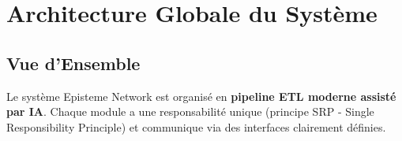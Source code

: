 \documentclass[12pt,a4paper]{report}
\begin{document}
\chapter{Architecture Globale du Système}

\section{Vue d'Ensemble}

Le système Episteme Network est organisé en \textbf{pipeline ETL moderne assisté par IA}. Chaque module a une responsabilité unique (principe SRP - Single Responsibility Principle) et communique via des interfaces clairement définies.
\end{document}
